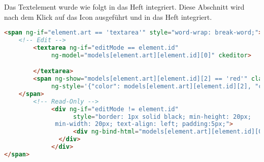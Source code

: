 Das Textelement wurde wie folgt in das Heft integriert. Diese Abschnitt wird nach dem Klick auf das Icon ausgeführt und in das Heft integriert.
\begin{lstlisting}[caption={Einbindung des Textelements}, language=HTML]
<span ng-if="element.art == 'textarea'" style="word-wrap: break-word;">
	<!-- Edit -->
        <textarea ng-if="editMode == element.id"
             ng-model="models[element.art][element.id][0]" ckeditor>

        </textarea>
        <span ng-show="models[element.art][element.id][2] == 'red'" class="glyphicon glyphicon-exclamation-sign"
             ng-style='{"color": models[element.art][element.id][2], "cursor": "pointer"}'>
	</span>
        <!-- Read-Only -->
             <div ng-if="editMode != element.id"
                   style="border: 1px solid black; min-height: 20px; 
			  min-width: 20px; text-align: left; padding:5px;">
                   <div ng-bind-html="models[element.art][element.id][0]" style="word-wrap: break-word; ">
	           </div>
             </div>
</span>
\end{lstlisting}


